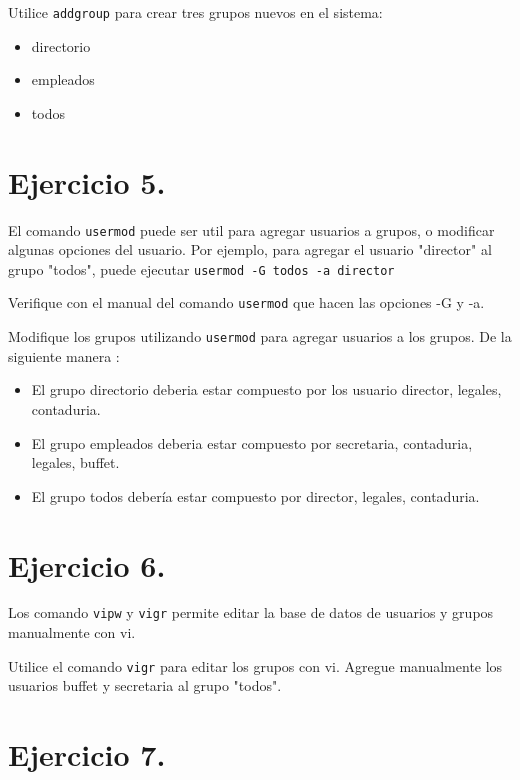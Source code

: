 \documentclass[12pt]{article}
\begin{document}
Utilice \texttt{addgroup} para crear tres grupos nuevos en el sistema:

\begin{itemize}
\item directorio
\item empleados
\item todos
\end{itemize}

\section{Ejercicio 5.}
El comando \texttt{usermod} puede ser util para agregar usuarios a grupos, o modificar algunas opciones del usuario.
Por ejemplo, para agregar el usuario "director" al grupo "todos", puede ejecutar \texttt{usermod -G todos -a director}

Verifique con el manual del comando \texttt{usermod} que hacen las opciones -G y -a.

Modifique los grupos utilizando \texttt{usermod} para agregar usuarios a los grupos. De la siguiente manera :
 
\begin{itemize}
\item El grupo directorio deberia estar compuesto por los usuario director, legales, contaduria.
\item El grupo empleados deberia estar compuesto por secretaria, contaduria, legales, buffet.
\item El grupo todos debería estar compuesto por director, legales, contaduria.
\end{itemize}

\section{Ejercicio 6.}
Los comando \texttt{vipw} y \texttt{vigr} permite editar la base de datos de usuarios y grupos manualmente con vi.

Utilice el comando \texttt{vigr} para editar los grupos con vi. Agregue manualmente los usuarios buffet y secretaria al grupo "todos".


\section{Ejercicio 7.}
\end{document}
